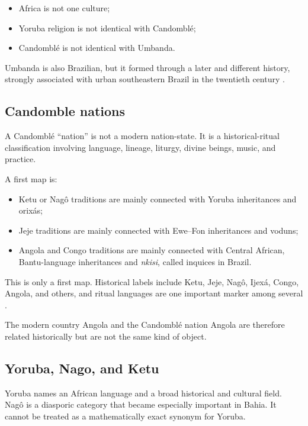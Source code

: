\begin{itemize}
\item Africa is not one culture;
\item Yoruba religion is not identical
with Candombl\'e;
\item Candombl\'e is not identical with
Umbanda.
\end{itemize}

Umbanda is also Brazilian, but it formed
through a later and different history,
strongly associated with urban southeastern
Brazil in the twentieth century
\cite{prandi1990umbanda}.

\subsection{Candomble nations}
\label{religion-section-candomble-nations}

A Candombl\'e ``nation'' is not a modern
nation-state.  It is a historical-ritual
classification involving language,
lineage, liturgy, divine beings, music,
and practice.

A first map is:

\begin{itemize}
\item Ketu or Nag\^o traditions are mainly
connected with Yoruba inheritances and
orix\'as;
\item Jeje traditions are mainly connected
with Ewe--Fon inheritances and voduns;
\item Angola and Congo traditions are
mainly connected with Central African,
Bantu-language inheritances and
\emph{nkisi}, called inquices in Brazil.
\end{itemize}

This is only a first map.  Historical
labels include Ketu, Jeje, Nag\^o, Ijex\'a,
Congo, Angola, and others, and ritual
languages are one important marker among
several \cite{castro1981lingua}.

The modern country Angola and the
Candombl\'e nation Angola are therefore
related historically but are not the same
kind of object.

\subsection{Yoruba, Nago, and Ketu}
\label{religion-section-yoruba-nago-ketu}

Yoruba names an African language and a
broad historical and cultural field.
Nag\^o is a diasporic category that became
especially important in Bahia.  It cannot
be treated as a mathematically exact
synonym for Yoruba.

